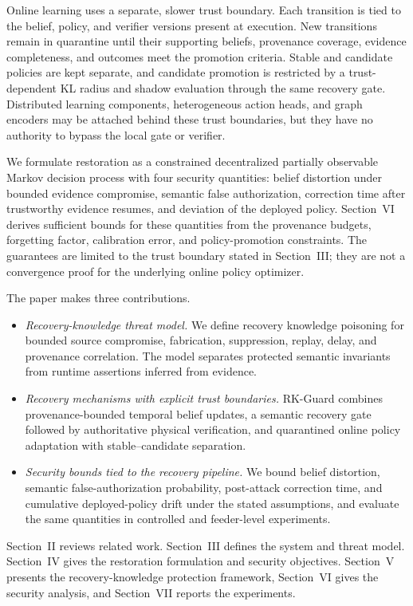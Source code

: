 Online learning uses a separate, slower trust boundary. Each transition is tied to the belief, policy, and verifier versions present at execution. New transitions remain in quarantine until their supporting beliefs, provenance coverage, evidence completeness, and outcomes meet the promotion criteria. Stable and candidate policies are kept separate, and candidate promotion is restricted by a trust-dependent KL radius and shadow evaluation through the same recovery gate. Distributed learning components, heterogeneous action heads, and graph encoders may be attached behind these trust boundaries, but they have no authority to bypass the local gate or verifier.

We formulate restoration as a constrained decentralized partially observable Markov decision process with four security quantities: belief distortion under bounded evidence compromise, semantic false authorization, correction time after trustworthy evidence resumes, and deviation of the deployed policy. Section~VI derives sufficient bounds for these quantities from the provenance budgets, forgetting factor, calibration error, and policy-promotion constraints. The guarantees are limited to the trust boundary stated in Section~III; they are not a convergence proof for the underlying online policy optimizer.

The paper makes three contributions.
\begin{itemize}
\item \emph{Recovery-knowledge threat model.} We define recovery knowledge poisoning for bounded source compromise, fabrication, suppression, replay, delay, and provenance correlation. The model separates protected semantic invariants from runtime assertions inferred from evidence.

\item \emph{Recovery mechanisms with explicit trust boundaries.} RK-Guard combines provenance-bounded temporal belief updates, a semantic recovery gate followed by authoritative physical verification, and quarantined online policy adaptation with stable--candidate separation.

\item \emph{Security bounds tied to the recovery pipeline.} We bound belief distortion, semantic false-authorization probability, post-attack correction time, and cumulative deployed-policy drift under the stated assumptions, and evaluate the same quantities in controlled and feeder-level experiments.
\end{itemize}

Section~II reviews related work. Section~III defines the system and threat model. Section~IV gives the restoration formulation and security objectives. Section~V presents the recovery-knowledge protection framework, Section~VI gives the security analysis, and Section~VII reports the experiments.

